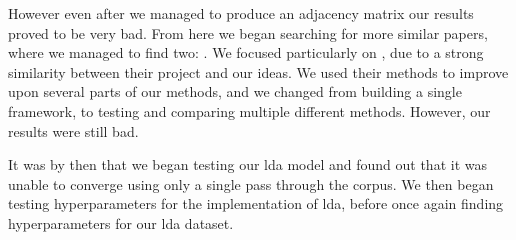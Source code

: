 However even after we managed to produce an adjacency matrix our results proved to be very bad.
From here we began searching for more similar papers, where we managed to find two: .
We focused particularly on , due to a strong similarity between their project and our ideas.
We used their methods to improve upon several parts of our methods, and we changed from building a single framework, to testing and comparing multiple different methods. 
However, our results were still bad.

It was by then that we began testing our lda model and found out that it was unable to converge using only a single pass through the corpus. We then began testing hyperparameters for the implementation of lda, before once again finding hyperparameters for our lda dataset.
